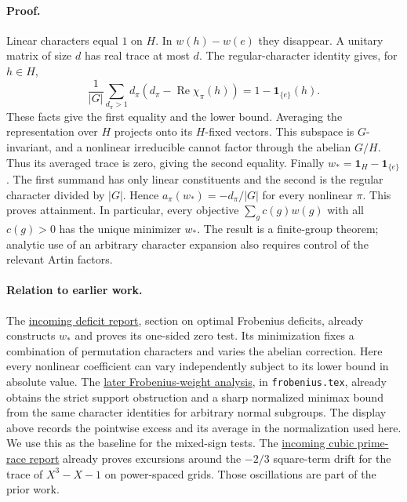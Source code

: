 \paragraph{Proof.}
Linear characters equal $1$ on $H$. In $w(h)-w(e)$ they disappear. A unitary matrix of size $d$ has real trace at most $d$. The regular-character identity gives, for $h\in H$,
\[
 \frac1{|G|}\sum_{d_\pi>1}d_\pi(d_\pi-\operatorname{Re}\chi_\pi(h))
    =1-\mathbf{1}_{\{e\}}(h).
\]
These facts give the first equality and the lower bound. Averaging the representation over $H$ projects onto its $H$-fixed vectors. This subspace is $G$-invariant, and a nonlinear irreducible cannot factor through the abelian $G/H$. Thus its averaged trace is zero, giving the second equality. Finally $w_*=\mathbf{1}_H-\mathbf{1}_{\{e\}}$. The first summand has only linear constituents and the second is the regular character divided by $|G|$. Hence $a_\pi(w_*)=-d_\pi/|G|$ for every nonlinear $\pi$. This proves attainment. In particular, every objective $\sum_g c(g)w(g)$ with all $c(g)>0$ has the unique minimizer $w_*$. The result is a finite-group theorem; analytic use of an arbitrary character expansion also requires control of the relevant Artin factors.

\paragraph{Relation to earlier work.}
The \href{https://github.com/VladimirReshetnikov/ProveIt/blob/5cc267af75a635199ac5d93a7d49cbce521daefc/docs/incoming/grh_deficit_transfer_2026-11-25.zip}{incoming deficit report}, section on optimal Frobenius deficits, already constructs $w_*$ and proves its one-sided zero test. Its minimization fixes a combination of permutation characters and varies the abelian correction. Here every nonlinear coefficient can vary independently subject to its lower bound in absolute value. The \href{https://github.com/VladimirReshetnikov/ProveIt/blob/5cc267af75a635199ac5d93a7d49cbce521daefc/docs/incoming/grh_sparse_singular_moduli.zip}{later Frobenius-weight analysis}, in \texttt{frobenius.tex}, already obtains the strict support obstruction and a sharp normalized minimax bound from the same character identities for arbitrary normal subgroups. The display above records the pointwise excess and its average in the normalization used here. We use this as the baseline for the mixed-sign tests. The \href{https://github.com/VladimirReshetnikov/ProveIt/blob/5cc267af75a635199ac5d93a7d49cbce521daefc/docs/incoming/grh-progression-densities-and-cubic-prime-race.zip}{incoming cubic prime-race report} already proves excursions around the $-2/3$ square-term drift for the trace of $X^3-X-1$ on power-spaced grids. Those oscillations are part of the prior work.

